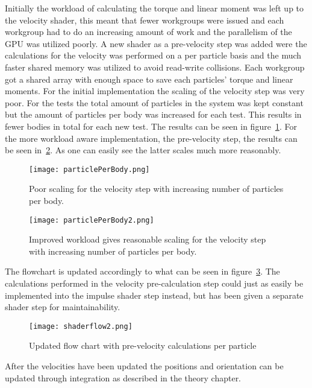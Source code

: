 Initially the workload of calculating the torque and linear moment was left up to the velocity shader,
this meant that fewer workgroups were issued and each workgroup had to do an increasing
amount of work and the parallelism of the GPU was utilized poorly. A new shader as
a pre-velocity step was added were the calculations for the velocity was performed
on a per particle basis and the much faster shared memory was utilized to avoid
read-write collisions. Each workgroup got a shared array with enough space to save
each particles' torque and linear moments. For the initial implementation the scaling of
the velocity step was very poor. For the tests the total amount of particles in the
system was kept constant but the amount of particles per body was increased for each test.
This results in fewer bodies in total for each new test. The results can be seen in figure~\ref{fig:velScale1}.
For the more workload aware implementation, the pre-velocity step, the results can be seen in~\ref{fig:velScale2}.
As one can easily see the latter scales much more reasonably.

\begin{figure}[H]
  \centering
  \texttt{[image: particlePerBody.png]}
  \caption{Poor scaling for the velocity step with increasing number of particles per body.}
  \label{fig:velScale1}
\end{figure}

\begin{figure}[H]
  \centering
  \texttt{[image: particlePerBody2.png]}
  \caption{Improved workload gives reasonable scaling for the velocity step with increasing number of particles per body.}
  \label{fig:velScale2}
\end{figure}

The flowchart is updated accordingly to what can be seen in figure~\ref{fig:shaderflow2}.
The calculations performed in the velocity pre-calculation step could just as easily
be implemented into the impulse shader step instead, but has been given a separate shader
step for maintainability.

\begin{figure}[H]
  \centering
  \texttt{[image: shaderflow2.png]}
  \caption{Updated flow chart with pre-velocity calculations per particle}
  \label{fig:shaderflow2}
\end{figure}


After the velocities have been updated the positions and orientation can be
updated through integration as described in the theory chapter.

